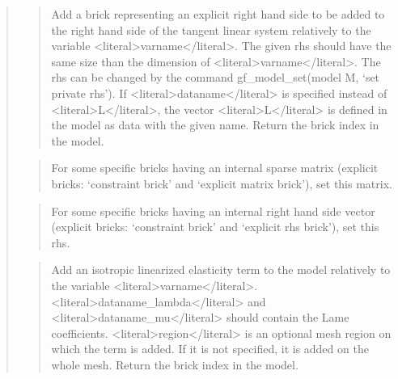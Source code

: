 \documentclass[a4paper,11pt,english]{sphinxmanual}
\begin{document}
\begin{quote}
\sphinxAtStartPar
{}
\begin{quote}

\sphinxAtStartPar
Add a brick representing an explicit right hand side to be added to
the right hand side of the tangent linear system relatively to the
variable \textless{}literal\textgreater{}varname\textless{}/literal\textgreater{}. The given rhs should have the same size than the
dimension of \textless{}literal\textgreater{}varname\textless{}/literal\textgreater{}. The rhs can be changed by the command
gf\_model\_set(model M, ‘set private rhs’). If \textless{}literal\textgreater{}dataname\textless{}/literal\textgreater{} is specified instead of
\textless{}literal\textgreater{}L\textless{}/literal\textgreater{}, the vector \textless{}literal\textgreater{}L\textless{}/literal\textgreater{} is defined in the model as data with the given name.
Return the brick index in the model.
\end{quote}

\sphinxAtStartPar
{}
\begin{quote}

\sphinxAtStartPar
For some specific bricks having an internal sparse matrix
(explicit bricks: ‘constraint brick’ and ‘explicit matrix brick’),
set this matrix.
\end{quote}

\sphinxAtStartPar
{}
\begin{quote}

\sphinxAtStartPar
For some specific bricks having an internal right hand side vector
(explicit bricks: ‘constraint brick’ and ‘explicit rhs brick’),
set this rhs.
\end{quote}

\sphinxAtStartPar
{}
\begin{quote}

\sphinxAtStartPar
Add an isotropic linearized elasticity term to the model relatively to
the variable \textless{}literal\textgreater{}varname\textless{}/literal\textgreater{}. \textless{}literal\textgreater{}dataname\_lambda\textless{}/literal\textgreater{} and \textless{}literal\textgreater{}dataname\_mu\textless{}/literal\textgreater{} should
contain the Lame coefficients. \textless{}literal\textgreater{}region\textless{}/literal\textgreater{} is an optional mesh region
on which the term is added. If it is not specified, it is added
on the whole mesh. Return the brick index in the model.
\end{quote}


\end{quote}
\end{document}
